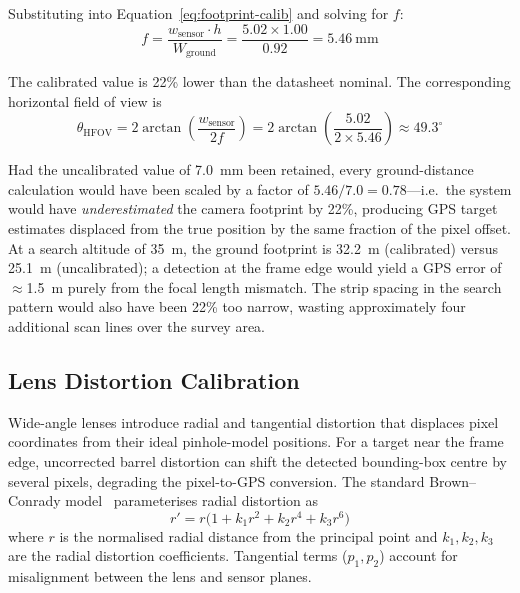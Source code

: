 Substituting into Equation~\ref{eq:footprint-calib} and solving for $f$:
\begin{equation}\label{eq:fov-result}
    f = \frac{w_{\text{sensor}} \cdot h}{W_{\text{ground}}} = \frac{5.02 \times 1.00}{0.92} = \SI{5.46}{\milli\metre}
\end{equation}

The calibrated value is 22\% lower than the datasheet nominal. The corresponding horizontal field of view is
\begin{equation}
    \theta_{\text{HFOV}} = 2 \arctan\!\left(\frac{w_{\text{sensor}}}{2f}\right) = 2 \arctan\!\left(\frac{5.02}{2 \times 5.46}\right) \approx 49.3^{\circ}
\end{equation}

Had the uncalibrated value of \SI{7.0}{\milli\metre} been retained, every ground-distance calculation would have been scaled by a factor of $5.46/7.0 = 0.78$---i.e.\ the system would have \emph{underestimated} the camera footprint by 22\%, producing GPS target estimates displaced from the true position by the same fraction of the pixel offset. At a search altitude of \SI{35}{\metre}, the ground footprint is \SI{32.2}{\metre} (calibrated) versus \SI{25.1}{\metre} (uncalibrated); a detection at the frame edge would yield a GPS error of $\approx$\SI{1.5}{\metre} purely from the focal length mismatch. The strip spacing in the search pattern would also have been 22\% too narrow, wasting approximately four additional scan lines over the survey area.

\subsection{Lens Distortion Calibration}\label{sec:cal:lens}

Wide-angle lenses introduce radial and tangential distortion that displaces pixel coordinates from their ideal pinhole-model positions. For a target near the frame edge, uncorrected barrel distortion can shift the detected bounding-box centre by several pixels, degrading the pixel-to-GPS conversion. The standard Brown--Conrady model~\cite{brown1966decentering} parameterises radial distortion as
\begin{equation}\label{eq:distortion}
    r' = r\bigl(1 + k_1 r^2 + k_2 r^4 + k_3 r^6\bigr)
\end{equation}
where $r$ is the normalised radial distance from the principal point and $k_1, k_2, k_3$ are the radial distortion coefficients. Tangential terms ($p_1, p_2$) account for misalignment between the lens and sensor planes.

